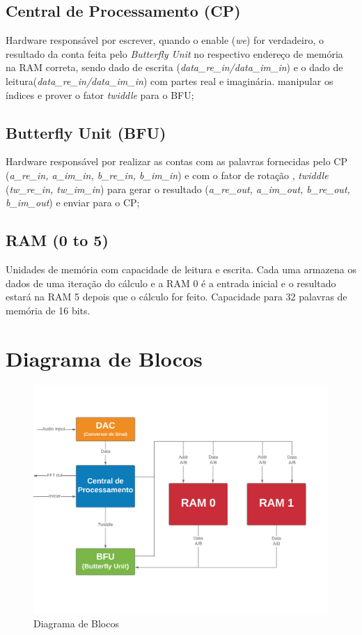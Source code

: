 \documentclass{article}
\newcommand{\tit}[1]{\textit{#1}}
\begin{document}
\subsection{Central de Processamento (CP)}
    Hardware responsável por escrever, quando o enable (\tit{we}) for verdadeiro, o resultado da conta feita pelo \tit{Butterfly Unit} no respectivo endereço de memória na RAM correta, sendo dado de escrita (\tit{data\_re\_in/data\_im\_in}) e o dado de leitura(\tit{data\_re\_in/data\_im\_in}) com partes real e imaginária. manipular os índices e prover o fator \tit{twiddle} para o BFU;
\subsection{Butterfly Unit (BFU)}
    Hardware responsável por realizar as contas com as palavras fornecidas pelo CP (\tit{a\_re\_in, a\_im\_in, b\_re\_in, b\_im\_in}) e com o fator de rotação , \tit{twiddle} (\tit{tw\_re\_in, tw\_im\_in}) para gerar o resultado (\tit{a\_re\_out, a\_im\_out, b\_re\_out, b\_im\_out}) e enviar para o CP;
\subsection{RAM (0 to 5)}
    Unidades de memória com capacidade de leitura e escrita. Cada uma armazena os dados de uma iteração do cálculo e a RAM 0 é a entrada inicial e o resultado estará na RAM 5 depois que o cálculo for feito. Capacidade para 32 palavras de memória de 16 bits.

\newpage

\section{Diagrama de Blocos}

\begin{figure}[h!]
  \includegraphics[width=\linewidth]{img/img.png}
  \caption{Diagrama de Blocos}
  \label{fig:diag}
\end{figure}

\newpage


\end{document}
